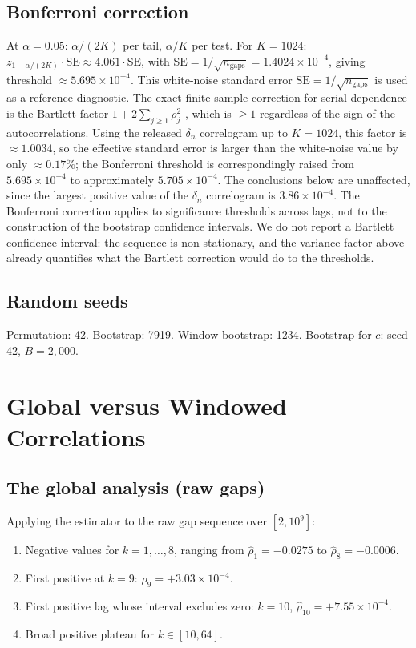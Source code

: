 \documentclass[11pt]{article}
\begin{document}
\subsection{Bonferroni correction}
At $\alpha = 0.05$: $\alpha/(2K)$ per tail, $\alpha/K$ per test.
For $K = 1024$: $z_{1-\alpha/(2K)} \cdot \mathrm{SE} \approx 4.061 \cdot
\mathrm{SE}$, with $\mathrm{SE} = 1/\sqrt{n_{\text{gaps}}} = 1.4024
\times 10^{-4}$, giving threshold $\approx 5.695 \times 10^{-4}$.
This white-noise standard error $\mathrm{SE} = 1/\sqrt{n_{\text{gaps}}}$
is used as a reference diagnostic. The exact finite-sample correction
for serial dependence is the Bartlett factor
$1 + 2\sum_{j \geq 1}\rho_j^2$ \cite{Bartlett1946}, which is
$\geq 1$ regardless of the sign of the autocorrelations. Using the
released $\delta_n$ correlogram up to $K = 1024$, this factor is
$\approx 1.0034$, so the
effective standard error is larger than the white-noise value by only
$\approx 0.17\%$; the Bonferroni threshold is correspondingly raised
from $5.695 \times 10^{-4}$ to approximately $5.705 \times 10^{-4}$.
The conclusions below are unaffected, since the largest positive value
of the $\delta_n$ correlogram is $3.86 \times 10^{-4}$.
The Bonferroni correction applies to significance thresholds across lags,
not to the construction of the bootstrap confidence intervals.
We do not report a Bartlett confidence interval: the sequence is
non-stationary, and the variance factor above already quantifies what
the Bartlett correction would do to the thresholds.

\subsection{Random seeds}
Permutation: 42. Bootstrap: 7919. Window bootstrap: 1234. Bootstrap
for $c$: seed 42, $B = 2{,}000$.

\section{Global versus Windowed Correlations}\label{sec:global}

\subsection{The global analysis (raw gaps)}
Applying the estimator to the raw gap sequence over $[2, 10^9]$:
\begin{enumerate}
\item Negative values for $k = 1, \ldots, 8$, ranging from
      $\hat\rho_1 = -0.0275$ to $\hat\rho_8 = -0.0006$.
\item First positive at $k = 9$: $\hat\rho_9 = +3.03 \times 10^{-4}$.
\item First positive lag whose interval excludes zero: $k = 10$,
      $\hat\rho_{10} = +7.55 \times 10^{-4}$.
\item Broad positive plateau for $k \in [10, 64]$.
\end{enumerate}
\end{document}
